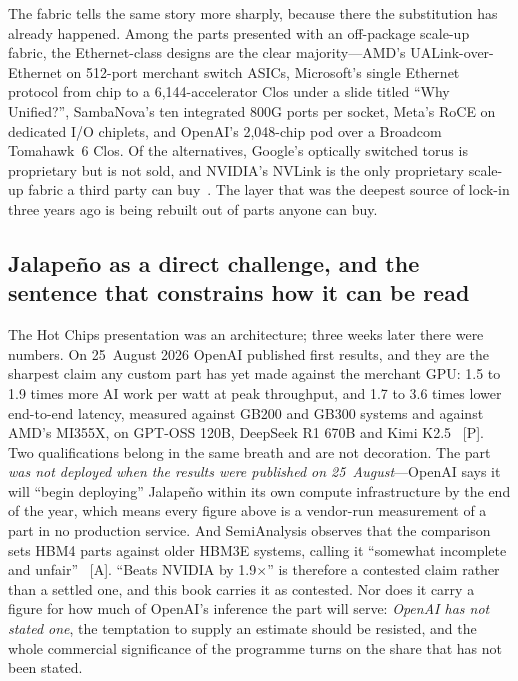 The fabric tells the same story more sharply, because there the substitution has already happened. Among the parts presented with an off-package scale-up fabric, the Ethernet-class designs are the clear majority---AMD's UALink-over-Ethernet on 512-port merchant switch ASICs, Microsoft's single Ethernet protocol from chip to a 6{,}144-accelerator Clos under a slide titled ``Why Unified?'', SambaNova's ten integrated 800G ports per socket, Meta's RoCE on dedicated I/O chiplets, and OpenAI's 2{,}048-chip pod over a Broadcom Tomahawk~6 Clos. Of the alternatives, Google's optically switched torus is proprietary but is not sold, and NVIDIA's NVLink is the only proprietary scale-up fabric a third party can buy~\cite{hc2026-scaleup,hc2026-jalapeno,hc2026-tpu8}. The layer that was the deepest source of lock-in three years ago is being rebuilt out of parts anyone can buy.

\subsection{Jalape\~no as a direct challenge, and the sentence that constrains how it can be read}

The Hot Chips presentation was an architecture; three weeks later there were numbers. On 25~August 2026 OpenAI published first results, and they are the sharpest claim any custom part has yet made against the merchant GPU: 1.5 to 1.9 times more AI work per watt at peak throughput, and 1.7 to 3.6 times lower end-to-end latency, measured against GB200 and GB300 systems and against AMD's MI355X, on GPT-OSS 120B, DeepSeek R1 670B and Kimi K2.5~\cite{jalapeno-results} [P]. Two qualifications belong in the same breath and are not decoration. The part \emph{was not deployed when the results were published on 25~August}---OpenAI says it will ``begin deploying'' Jalape\~no within its own compute infrastructure by the end of the year, which means every figure above is a vendor-run measurement of a part in no production service. And SemiAnalysis observes that the comparison sets HBM4 parts against older HBM3E systems, calling it ``somewhat incomplete and unfair''~\cite{jalapeno-results} [A]. ``Beats NVIDIA by 1.9$\times$'' is therefore a contested claim rather than a settled one, and this book carries it as contested. Nor does it carry a figure for how much of OpenAI's inference the part will serve: \emph{OpenAI has not stated one}, the temptation to supply an estimate should be resisted, and the whole commercial significance of the programme turns on the share that has not been stated.

